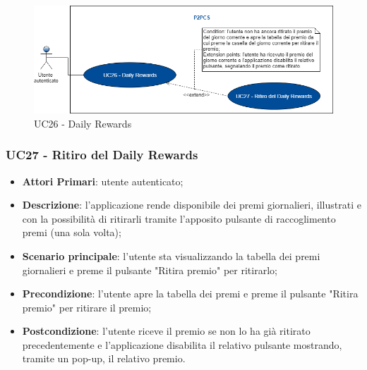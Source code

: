 \begin{figure}[h]
	\includegraphics[width=13.2cm]{res/images/UC24Daily.png}
	\centering
	\caption{UC26 - Daily Rewards}
\end{figure}
\subsubsection{UC27 - Ritiro del Daily Rewards}
\begin{itemize}
	\item \textbf{Attori Primari}: utente autenticato;
	\item \textbf{Descrizione}: l'applicazione rende disponibile dei premi giornalieri, illustrati e con la possibilità di ritirarli tramite l'apposito pulsante di raccoglimento premi (una sola volta);
	\item \textbf{Scenario principale}: l'utente sta visualizzando la tabella dei premi giornalieri e preme il pulsante "Ritira premio" per ritirarlo;
	\item \textbf{Precondizione}: l'utente apre la tabella dei premi e preme il pulsante "Ritira premio" per ritirare il premio;
	\item \textbf{Postcondizione}: l'utente riceve il premio se non lo ha già ritirato precedentemente e l'applicazione disabilita il relativo pulsante mostrando, tramite un pop-up, il relativo premio.  
\end{itemize} 